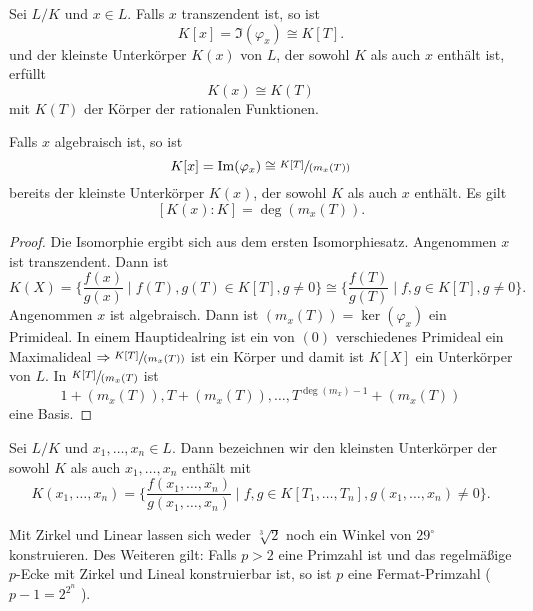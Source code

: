 \begin{proposition}
	Sei $L / K$ und $x \in L$. Falls $x$ transzendent ist, so ist 
	\[
		K[x] = \Im(\varphi_{x}) \cong K[T]
	.\] 
	und der kleinste Unterkörper $K(x)$ von $L$, der sowohl $K$ als auch $x$ enthält ist, erfüllt
	\[
		K(x) \cong K(T)
	\] 
	mit  $K(T)$ der Körper der rationalen Funktionen.

	Falls $x$ algebraisch ist, so ist
	\[
		K[x] = \Im(\varphi_{x}) \cong \sfrac{K[T]}{(m_{x}(T))}
	\] 
	bereits der kleinste Unterkörper $K(x)$, der sowohl $K$ als auch $x$ enthält.
	Es gilt
	\[
		[K(x):K] = \deg(m_x(T))
	.\] 
\end{proposition}

\begin{proof}
	Die Isomorphie ergibt sich aus dem ersten Isomorphiesatz.
	Angenommen $x$ ist transzendent. Dann ist 
	\[
		K(X) = \{\frac{f(x)}{g(x)} \mid f(T), g(T) \in K[T], g \neq 0\} \cong \{\frac{f(T)}{g(T)} \mid f,g \in K[T], g \neq 0\} 
	.\]
	Angenommen $x$ ist algebraisch. Dann ist $(m_{x}(T)) = \ker(\varphi_{x})$ ein Primideal.
	In einem Hauptidealring ist ein von $(0)$ verschiedenes Primideal ein Maximalideal $\Rightarrow \sfrac{K[T]}{(m_{x}(T))}$ ist ein
	Körper und damit ist $K[X]$ ein Unterkörper von $L$. In $\sfrac{K[T]}{(m_{x}(T)}$ ist
	\[
		1 + (m_{x}(T)), T + (m_{x}(T)),\ldots, T^{\deg(m_{x})-1} + (m_{x}(T))
	\] 
	eine Basis.
\end{proof}

\begin{definition}
	Sei $L / K$ und $x_1,\ldots,x_{n} \in L$. Dann bezeichnen wir den kleinsten Unterkörper der sowohl $K$ als auch $x_1,\ldots,x_{n}$ enthält mit
	\[
		K(x_1,\ldots,x_{n}) = \{\frac{f(x_1,\ldots,x_{n})}{g(x_1,\ldots,x_{n})} \mid f,g \in K[T_1,\ldots,T_{n}], g(x_1,\ldots,x_{n}) \neq 0\} 
	.\] 
\end{definition}

\begin{corollary}[Wantzel, 1837]
	Mit Zirkel und Linear lassen sich weder $\sqrt[3]{2}$ noch ein Winkel von $29^{\circ}$ konstruieren.
	Des Weiteren gilt: Falls $p > 2$ eine Primzahl ist und das regelmäßige $p$-Ecke mit
	Zirkel und Lineal konstruierbar ist, so ist $p$ eine Fermat-Primzahl ($p-1 = 2^{2^{n}}$ ).
\end{corollary}

